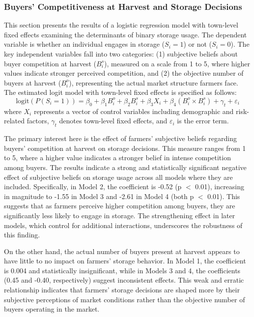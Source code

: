 \documentclass[12pt]{article}
\begin{document}
\subsubsection{Buyers' Competitiveness at Harvest and Storage Decisions}
This section presents the results of a logistic regression model with town-level fixed effects examining the determinants of binary storage usage. The dependent variable is whether an individual engages in storage ($S_i = 1$) or not ($S_i = 0$). The key independent variables fall into two categories: (1) subjective beliefs about buyer competition at harvest ($B^s_i$), measured on a scale from 1 to 5, where higher values indicate stronger perceived competition, and (2) the objective number of buyers at harvest ($B^o_i$), representing the actual market structure farmers face. The estimated logit model with town-level fixed effects is specified as follows:
\begin{equation}
\text{logit} \left( P(S_i = 1) \right) = \beta_0 + \beta_1 B^o_i + \beta_2 B^s_i + \beta_3 X_i + \beta_4 (B^o_i \times B^s_i) + \gamma_t + \varepsilon_i
\end{equation}
where $X_i$ represents a vector of control variables including demographic and risk-related factors, $\gamma_t$ denotes town-level fixed effects, and $\varepsilon_i$ is the error term.




The primary interest here is the effect of farmers' subjective beliefs regarding buyers' competition at harvest on storage decisions. This measure ranges from 1 to 5, where a higher value indicates a stronger belief in intense competition among buyers. The results indicate a strong and statistically significant negative effect of subjective beliefs on storage usage across all models where they are included. Specifically, in Model 2, the coefficient is -0.52 (p $<$ 0.01), increasing in magnitude to -1.55 in Model 3 and -2.61 in Model 4 (both p $<$ 0.01). This suggests that as farmers perceive higher competition among buyers, they are significantly less likely to engage in storage. The strengthening effect in later models, which control for additional interactions, underscores the robustness of this finding.

On the other hand, the actual number of buyers present at harvest appears to have little to no impact on farmers' storage behavior. In Model 1, the coefficient is 0.004 and statistically insignificant, while in Models 3 and 4, the coefficients (0.45 and -0.40, respectively) suggest inconsistent effects. This weak and erratic relationship indicates that farmers’ storage decisions are shaped more by their subjective perceptions of market conditions rather than the objective number of buyers operating in the market.
\end{document}
